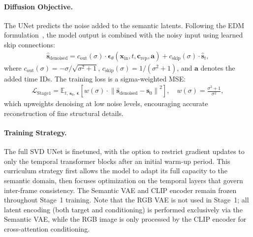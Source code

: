 \paragraph{Diffusion Objective.}
The UNet predicts the noise added to the semantic latents. Following the EDM formulation~\cite{karras2022elucidating}, the model output is combined with the noisy input using learned skip connections:
\begin{align}
    \hat{\mathbf{s}}_{\text{denoised}} = c_{\text{out}}(\sigma) \cdot \boldsymbol{\epsilon}_\theta(\mathbf{x}_{\text{in}}, t, \mathbf{c}_{\text{rep}}, \mathbf{a}) + c_{\text{skip}}(\sigma) \cdot \hat{\mathbf{s}}_t,
    \label{eq:edm_denoised_stage1}
\end{align}
where $c_{\text{out}}(\sigma) = -\sigma / \sqrt{\sigma^2 + 1}$, $c_{\text{skip}}(\sigma) = 1 / (\sigma^2 + 1)$, and $\mathbf{a}$ denotes the added time IDs. The training loss is a sigma-weighted MSE:
\begin{align}
    \mathcal{L}_{\text{Stage1}} = \mathbb{E}_{t,\, \mathbf{s}_0,\, \boldsymbol{\epsilon}}\!\left[w(\sigma) \cdot \left\|\hat{\mathbf{s}}_{\text{denoised}} - \mathbf{s}_0\right\|^2\right], \quad w(\sigma) = \frac{\sigma^2 + 1}{\sigma^2},
    \label{eq:stage1_loss}
\end{align}
which upweights denoising at low noise levels, encouraging accurate reconstruction of fine structural details.

\paragraph{Training Strategy.}
The full SVD UNet is finetuned, with the option to restrict gradient updates to only the temporal transformer blocks after an initial warm-up period. This curriculum strategy first allows the model to adapt its full capacity to the semantic domain, then focuses optimization on the temporal layers that govern inter-frame consistency. The Semantic VAE and CLIP encoder remain frozen throughout Stage~1 training. Note that the RGB VAE is not used in Stage~1; all latent encoding (both target and conditioning) is performed exclusively via the Semantic VAE, while the RGB image is only processed by the CLIP encoder for cross-attention conditioning.

